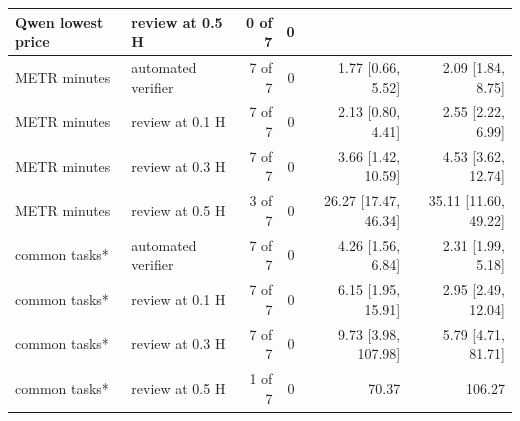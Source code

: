 \begin{table}[t]
\begin{tabular}{llrrrr}
Qwen lowest price & review at 0.5 H & 0 of 7 & 0 &  &  \\
\midrule
METR minutes & automated verifier & 7 of 7 & 0 & 1.77 [0.66, 5.52] & 2.09 [1.84, 8.75] \\
METR minutes & review at 0.1 H & 7 of 7 & 0 & 2.13 [0.80, 4.41] & 2.55 [2.22, 6.99] \\
METR minutes & review at 0.3 H & 7 of 7 & 0 & 3.66 [1.42, 10.59] & 4.53 [3.62, 12.74] \\
METR minutes & review at 0.5 H & 3 of 7 & 0 & 26.27 [17.47, 46.34] & 35.11 [11.60, 49.22] \\
\midrule
common tasks* & automated verifier & 7 of 7 & 0 & 4.26 [1.56, 6.84] & 2.31 [1.99, 5.18] \\
common tasks* & review at 0.1 H & 7 of 7 & 0 & 6.15 [1.95, 15.91] & 2.95 [2.49, 12.04] \\
common tasks* & review at 0.3 H & 7 of 7 & 0 & 9.73 [3.98, 107.98] & 5.79 [4.71, 81.71] \\
common tasks* & review at 0.5 H & 1 of 7 & 0 & 70.37 & 106.27 \\
\bottomrule
\end{tabular}
\end{table}
